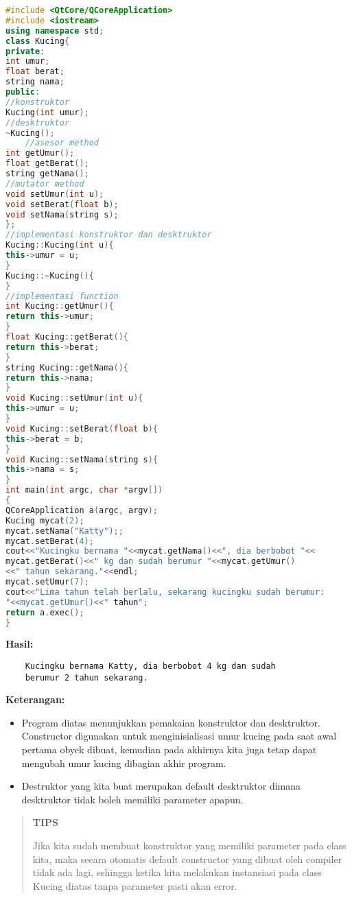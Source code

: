 \begin{lstlisting}[language=c++, caption=Menggunakan Constructor dan Destructor, label=contoh6-8]
#include <QtCore/QCoreApplication>
#include <iostream>
using namespace std;
class Kucing{
private:
int umur;
float berat;
string nama;
public:
//konstruktor
Kucing(int umur);
//desktruktor
~Kucing();
    //asesor method
int getUmur();
float getBerat();
string getNama();
//mutator method
void setUmur(int u);
void setBerat(float b);
void setNama(string s);
};
//implementasi konstruktor dan desktruktor
Kucing::Kucing(int u){
this->umur = u;
}
Kucing::~Kucing(){
}
//implementasi function
int Kucing::getUmur(){
return this->umur;
}
float Kucing::getBerat(){
return this->berat;
}
string Kucing::getNama(){
return this->nama;
}
void Kucing::setUmur(int u){
this->umur = u;
}
void Kucing::setBerat(float b){
this->berat = b;
}
void Kucing::setNama(string s){
this->nama = s;
}
int main(int argc, char *argv[])
{
QCoreApplication a(argc, argv);
Kucing mycat(2);
mycat.setNama("Katty");;
mycat.setBerat(4);
cout<<"Kucingku bernama "<<mycat.getNama()<<", dia berbobot "<<
mycat.getBerat()<<" kg dan sudah berumur "<<mycat.getUmur()
<<" tahun sekarang."<<endl;
mycat.setUmur(7);
cout<<"Lima tahun telah berlalu, sekarang kucingku sudah berumur:
"<<mycat.getUmur()<<" tahun";
return a.exec();
}
\end{lstlisting}

\textbf{Hasil:}
\begin{lstlisting}
	Kucingku bernama Katty, dia berbobot 4 kg dan sudah
	berumur 2 tahun sekarang.
\end{lstlisting}
 

\textbf{Keterangan:}

\begin{itemize}

\item
  Program diatas menunjukkan pemakaian konstruktor dan desktruktor.
  Constructor digunakan untuk menginisialisasi umur kucing pada saat
  awal pertama obyek dibuat, kemudian pada akhirnya kita juga tetap
  dapat mengubah umur kucing dibagian akhir program.
\item
  Destruktor yang kita buat merupakan default desktruktor dimana
  desktruktor tidak boleh memiliki parameter apapun.
\end{itemize}

\begin{quotation}
{\LARGE {}} 	\textbf{TIPS} 
	
	Jika kita
	sudah membuat konstruktor yang memiliki parameter pada class kita, maka
	secara otomatis default constructor yang dibuat oleh compiler tidak ada
	lagi, sehingga ketika kita melakukan instansiasi pada class Kucing
	diatas tanpa parameter pasti akan error.
\end{quotation}


